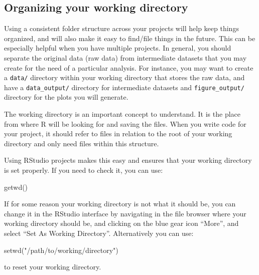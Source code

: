 \documentclass[
]{book}
\newenvironment{Shaded}{\begin{snugshade}}{\end{snugshade}}
\newcommand{\FunctionTok}[1]{\textcolor[rgb]{0.00,0.00,0.00}{#1}}
\newcommand{\NormalTok}[1]{#1}
\newcommand{\StringTok}[1]{\textcolor[rgb]{0.31,0.60,0.02}{#1}}
\begin{document}
\hypertarget{organizing-your-working-directory}{%
\subsection*{Organizing your working directory}\label{organizing-your-working-directory}}

Using a consistent folder structure across your projects will help keep things organized, and will also make it easy to find/file things in the future. This can be especially helpful when you have multiple projects. In general, you should separate the original data (raw data) from intermediate datasets that you may create for the need of a particular analysis. For instance, you may want to create a \texttt{data/} directory within your working directory that stores the raw data, and have a \texttt{data\_output/} directory for intermediate datasets and \texttt{figure\_output/} directory for the plots you will generate.

The working directory is an important concept to understand. It is the place from where R will be looking for and saving the files. When you write code for your project, it should refer to files in relation to the root of your working directory and only need files within this structure.

Using RStudio projects makes this easy and ensures that your working directory is set properly. If you need to check it, you can use:

\begin{Shaded}
\begin{Highlighting}[]
\FunctionTok{getwd}\NormalTok{()}
\end{Highlighting}
\end{Shaded}

If for some reason your working directory is not what it should be, you can change it in the RStudio interface by navigating in the file browser where your working directory should be, and clicking on the blue gear icon ``More'', and select ``Set As Working Directory''. Alternatively you can use:

\begin{Shaded}
\begin{Highlighting}[]
\FunctionTok{setwd}\NormalTok{(}\StringTok{"/path/to/working/directory"}\NormalTok{)}
\end{Highlighting}
\end{Shaded}

to reset your working directory.
\end{document}
